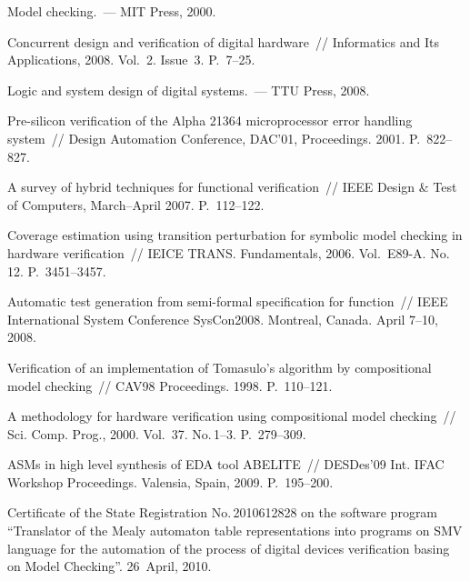 \begin{multicols}{2}
{\small\frenchspacing
{%
\begin{thebibliography}{99}   

Model checking.~--- MIT Press, 2000.

Concurrent design and verification of digital  hardware~// Informatics and Its Applications, 2008. 
Vol.~2. Issue~3. P.~7--25.   

Logic and system design of digital systems.~--- TTU Press, 2008.

Pre-silicon verification of the Alpha 21364 microprocessor error handling system~// Design 
Automation Conference, DAC'01, Proceedings. 2001. P.~822--827.

A survey of hybrid techniques for functional verification~// IEEE Design \& Test of Computers,  
March--April 2007. P.~112--122.

Coverage estimation using transition perturbation for symbolic model checking in hardware 
verification~// \mbox{IEICE} TRANS. Fundamentals, 2006. Vol.~E89-A. No.\,12. 
P.~3451--3457.  


Automatic test generation from semi-formal specification for function~//
IEEE International System Conference SysCon2008. Montreal, Canada. April 7--10, 2008.

Verification of an implementation of Tomasulo's algorithm by compositional model checking~// 
CAV98 Proceedings. 1998. P.~110--121. 

A methodology for hardware verification using compositional model checking~// Sci. Comp. 
Prog., 2000. Vol.~37. No.\,1--3. P.~279--309.    

ASMs in high level synthesis of EDA tool ABELITE~// DESDes'09  Int.   IFAC Workshop  
Proceedings. Valensia, Spain, 2009. P.~195--200.



Certificate of the State Registration No.\,2010612828 on the software program ``Translator of the 
Mealy automaton table representations into programs on SMV language for the automation of the 
process of digital devices verification basing on Model Checking''. 26~April, 2010.


\end{thebibliography}}}
\end{multicols}
